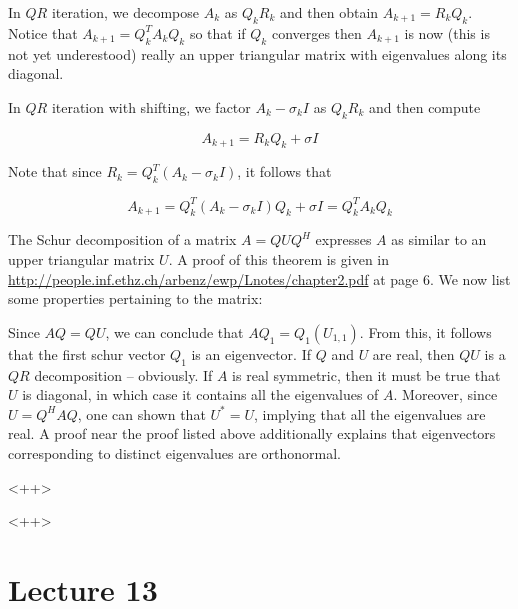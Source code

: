 \documentclass[../main.tex]{subfiles}
\begin{document}
\begin{definition}
    In $QR$ iteration, we decompose $A_k$ as $Q_kR_k$ and then obtain $A_{k+1} = R_kQ_k$. Notice that $A_{k+1} = Q_{k}^TA_kQ_k$ so that if $Q_k$ converges then $A_{k+1}$ is now (this is not yet underestood) really an upper triangular matrix with eigenvalues along its diagonal.
\end{definition}

\begin{definition}
    In $QR$ iteration with shifting, we factor $A_k - \sigma_k I$ as $Q_k R_k$ and then compute

    \[
        A_{k+1} = R_k Q_k + \sigma I
    \]

    Note that since $R_k = Q_k^T(A_k - \sigma_k I)$, it follows that

    \[
        A_{k+1} = Q_k^T(A_k - \sigma_k I)Q_k + \sigma I = Q_k^T A_k Q_k
    \]
\end{definition}

\begin{definition}
    The Schur decomposition of a matrix $A = QUQ^H$ expresses $A$ as similar to an upper triangular matrix $U$. A proof of this theorem is given in \url{http://people.inf.ethz.ch/arbenz/ewp/Lnotes/chapter2.pdf} at page 6. We now list some properties pertaining to the matrix:

    \begin{outline}
        \1 Since $AQ = QU$, we can conclude that $AQ_1 = Q_1(U_{1,1})$. From this, it follows that the first schur vector $Q_1$ is an eigenvector.
        \1 If $Q$ and $U$ are real, then $QU$ is a $QR$ decomposition -- obviously.
        \1 If $A$ is real symmetric, then it must be true that $U$ is diagonal, in which case it contains all the eigenvalues of $A$. 
        \2 Moreover, since $U = Q^HAQ$, one can shown that $U^{*} = U$, implying that all the eigenvalues are real. A proof near the proof listed above additionally explains that eigenvectors corresponding to distinct eigenvalues are orthonormal.
    \end{outline}<++>
\end{definition}<++>

\section{Lecture 13}
\end{document}
